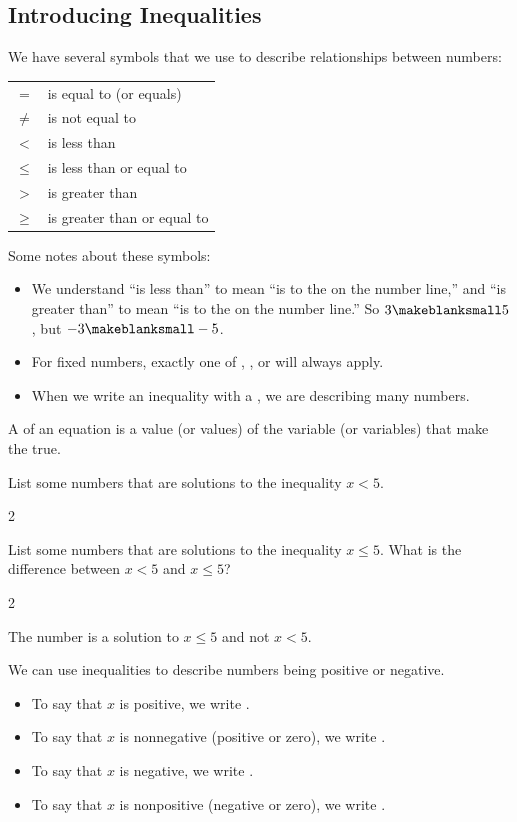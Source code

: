 \subsection{Introducing Inequalities} 
We have several symbols that we use to describe relationships between numbers:
\begin{center}
\begin{tabular}{cl}
$=$&is equal to (or equals)\\
$\neq$&is not equal to\\
$<$&is less than\\
$\leq$&is less than or equal to\\
$>$&is greater than\\
$\geq$&is greater than or equal to
\end{tabular}
\end{center}
Some notes about these symbols:
\begin{itemize}
\item We understand ``is less than'' to mean ``is to the \makeblank[1in] on the number line,'' and ``is greater than'' to mean ``is to the \makeblank[1in] on the number line.'' So $3\makeblanksmall 5$, but $-3\makeblanksmall -5$.
\item For fixed numbers, exactly one of \makeblanksmall, \makeblanksmall, or \makeblanksmall will always apply.
\item When we write an inequality with a \makeblank[1.5in], we are describing many numbers.
\end{itemize}
\begin{definition}
A  of an equation is a value (or values) of the variable (or variables) that make the \makeblank[1.5in] true.
\end{definition}
\begin{Example}
List some numbers that are solutions to the inequality $x<5$.
\begin{cpic}{}{2}
\end{cpic}
\end{Example}
\begin{Example}
List some numbers that are solutions to the inequality $x\leq 5$. What is the difference between $x<5$ and $x\leq 5$?
\begin{cpic}{}{2}
\end{cpic}
The number \makeblanksmall is a solution to $x\leq 5$ and not $x<5$.
\end{Example}
We can use inequalities to describe numbers being positive or negative.
\begin{itemize}
\item To say that $x$ is positive, we write \makeblank[1in].
\item To say that $x$ is nonnegative (positive or zero), we write \makeblank[1in].
\item To say that $x$ is negative, we write \makeblank[1in].
\item To say that $x$ is nonpositive (negative or zero), we write \makeblank[1in].
\end{itemize}